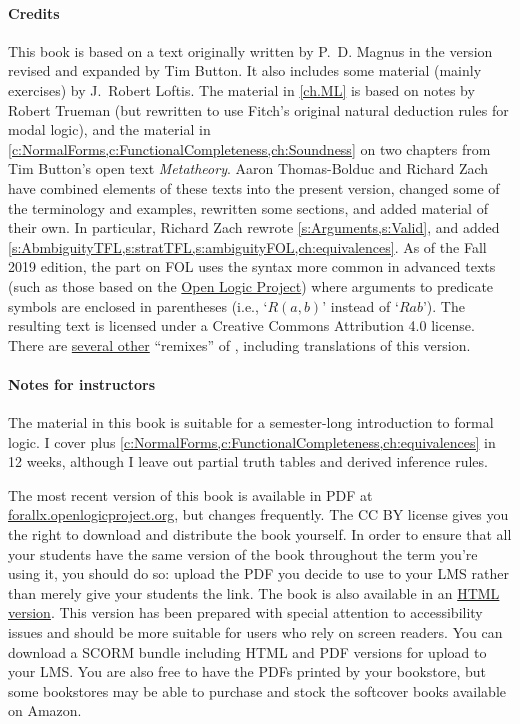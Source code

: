 \paragraph{Credits} This book is based on a text originally written by P.~D. Magnus in the version revised and expanded by Tim Button. It also includes some material (mainly exercises) by J.~Robert Loftis. The material in \cref{ch.ML} is based on notes by Robert Trueman (but rewritten to use Fitch's original natural deduction rules for modal logic), and the material in \cref{c:NormalForms,c:FunctionalCompleteness,ch:Soundness} on two chapters from Tim Button's open text \textit{Metatheory}. Aaron Thomas-Bolduc and Richard Zach have combined elements of these texts into the present version, changed some of the terminology and examples, rewritten some sections, and added material of their own.  In particular, Richard Zach rewrote \cref{s:Arguments,s:Valid}, and added \cref{s:AbmbiguityTFL,s:stratTFL,s:ambiguityFOL,ch:equivalences}. As of the Fall 2019 edition, the part on FOL uses the syntax more common in advanced texts (such as those based on the \href{https://openlogicproject.org/}{Open Logic Project}) where arguments to predicate symbols are enclosed in parentheses (i.e., `$R(a,b)$' instead of `$Rab$'). The resulting text is licensed under a Creative Commons Attribution 4.0 license. There are \href{https://github.com/OpenLogicProject/OpenLogic/wiki/Other-Logic-Textbooks}{several other} ``remixes'' of \forallx, including translations of this version.

\paragraph{Notes for instructors} The material in this book is suitable for a semester-long introduction to formal logic. I cover  plus \cref{c:NormalForms,c:FunctionalCompleteness,ch:equivalences} in 12 weeks, although I leave out partial truth tables and derived inference rules.

The most recent version of this book is available in PDF at
\href{https://forallx.openlogicproject.org}{forallx.openlogicproject.org},
but changes frequently.  The CC BY license gives you the right to
download and distribute the book yourself. In order to ensure that all
your students have the same version of the book throughout the term
you're using it, you should do so: upload the PDF you decide to use to
your LMS rather than merely give your students the link. The book is
also available in an
\href{https://forallx.openlogicproject.org/html/}{HTML version}. This
version has been prepared with special attention to accessibility
issues and should be more suitable for users who rely on screen
readers. You can download a SCORM bundle including HTML and PDF
versions for upload to your LMS. You are also free to have the PDFs
printed by your bookstore, but some bookstores may be able to purchase
and stock the softcover books available on Amazon.

